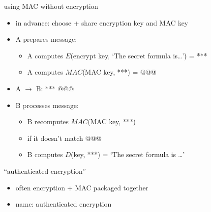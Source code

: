 \begin{frame}{using MAC without encryption}
    \begin{itemize}
    \item in advance: choose + share encryption key and MAC key
    \vspace{.5cm}
    \item A prepares message:
    \begin{itemize}
    \item A computes $E$(encrypt key, `The secret formula is\ldots') = ***
    \item A computes $MAC$(MAC key, ***) = @@@
    \end{itemize}
    \item A $\rightarrow$ B: *** @@@
    \item<2-> B processes message:
    \begin{itemize}
        \item B recomputes $MAC$(MAC key, ***)
        \item {} if it doesn't match @@@
        \item B computes $D$(key, ***) = `The secret formula is \ldots'
    \end{itemize}
    \end{itemize}
\end{frame}

\begin{frame}{``authenticated encryption''}
    \begin{itemize}
    \item often encryption + MAC packaged together
    \item name: authenticated encryption
    \end{itemize}
\end{frame}
